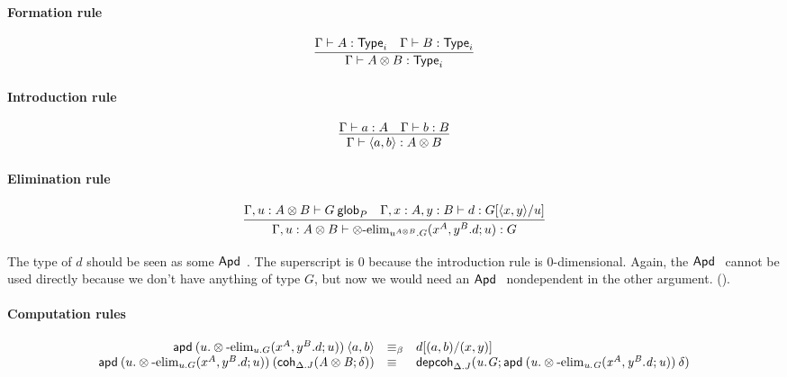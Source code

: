 \paragraph{Formation rule}

\begin{small}
  \[
  \infer{\wftype\Gamma{A\otimes B}} {\wftype\Gamma{A} & \wftype\Gamma{B}}
  \]
\end{small}

\paragraph{Introduction rule}

\begin{small}
  \[
  \infer{\ofglob{\Gamma}{\langle a, b\rangle}{A\otimes B}}
  {\ofglob{\Gamma}{a}{A}
    & \ofglob{\Gamma}{b}{B}}
  \]
\end{small}

\paragraph{Elimination rule}

\begin{small}
  \[
  \infer{\ofglob{\Gamma,u:A\otimes B}{\otimes\text{-elim}_{u^{A\otimes B}.G}
      {(x^A,y^B.d;u)}}{G}}
  {\wfglob{\Gamma,u:A\otimes B}{G}{P}
    & \ofglob{\Gamma,x:A,y:B}{d}{G[\langle x,y\rangle/u]}}
  \]
\end{small}

The type of $d$ should be seen as some $\mathsf{Apd} \: {} \: {}$. The superscript is
$0$ because the introduction rule is $0$-dimensional. Again, the
$\mathsf{Apd} \: {} \: {}$ cannot be used directly because we don’t have anything of
type $G$, but now we would need an $\mathsf{Apd} \: {} \: {}$ nondependent in the other
argument. ().

\paragraph{Computation rules}

\begin{small}
  \[
  \begin{array}{rll}
    \mathsf{apd} \: {(u.\otimes\text{-elim}_{u.G}
      {(x^A,y^B.d;u)})} \: {\langle a,b\rangle} & \equiv_\beta & d[(a,b)/(x,y)] \\
    \mathsf{apd} \: {(u.\otimes\text{-elim}_{u.G}
      {(x^A,y^B.d;u)})} \: {(\mathsf{coh}_{\Delta.J} \mathit{(A\otimes B;\delta)})} & \equiv &
    \mathsf{depcoh}_{\Delta.J} \mathit{(u.G;\mathsf{apd} \: {(u.\otimes\text{-elim}_{u.G}
      {(x^A,y^B.d;u)})} \: {\delta})}
  \end{array}
  \]
\end{small}

